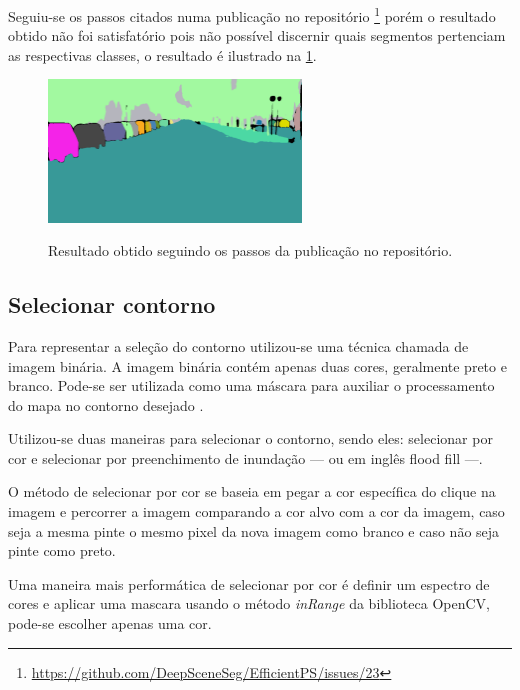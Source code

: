 Seguiu-se os passos citados numa publicação no repositório \footnote{\url{https://github.com/DeepSceneSeg/EfficientPS/issues/23}} porém o resultado obtido não foi satisfatório pois não possível discernir quais segmentos pertenciam as respectivas classes, o resultado é ilustrado na \cref{fig:resultado_obtido}.

\begin{figure}[!ht]
	\centering
    \caption{Resultado obtido seguindo os passos da publicação no repositório.}
	\includegraphics[width=0.6\textwidth]{figures/resultado_obtido.png}
	\label{fig:resultado_obtido}
\end{figure}

\subsection{Selecionar contorno}

Para representar a seleção do contorno utilizou-se uma técnica chamada de imagem binária.
A imagem  binária contém  apenas duas cores, geralmente preto e  branco. Pode-se ser utilizada como uma máscara para auxiliar o processamento do  mapa no contorno desejado \cite{Aznag2020}.

Utilizou-se duas maneiras para selecionar o contorno, sendo eles: selecionar por cor e selecionar por preenchimento de inundação — ou  em inglês  flood fill —.


O método de selecionar por cor se baseia em pegar a cor específica do clique na imagem e percorrer a imagem comparando a cor alvo com a cor da imagem, caso seja a mesma pinte o mesmo pixel da nova imagem como branco e caso não seja pinte como preto.

Uma maneira mais performática de selecionar por cor é definir um espectro de cores e aplicar uma mascara usando o método \textit{inRange} da biblioteca OpenCV, pode-se escolher apenas uma cor.


